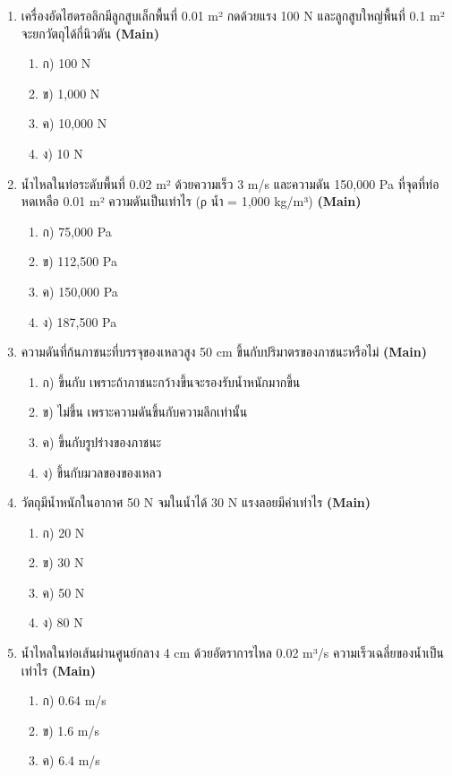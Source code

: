 \documentclass[12pt]{article}
\begin{document}
\begin{enumerate}[label=\arabic*.]
\item เครื่องอัดไฮดรอลิกมีลูกสูบเล็กพื้นที่ 0.01 m² กดด้วยแรง 100 N และลูกสูบใหญ่พื้นที่ 0.1 m² จะยกวัตถุได้กี่นิวตัน \hfill \textbf{\small (Main)}
\begin{enumerate}[label=)]
\item ก) 100 N
\item ข) 1,000 N
\item ค) 10,000 N
\item ง) 10 N
\end{enumerate}
\item น้ำไหลในท่อระดับพื้นที่ 0.02 m² ด้วยความเร็ว 3 m/s และความดัน 150,000 Pa ที่จุดที่ท่อหดเหลือ 0.01 m² ความดันเป็นเท่าไร (ρ น้ำ = 1,000 kg/m³) \hfill \textbf{\small (Main)}
\begin{enumerate}[label=)]
\item ก) 75,000 Pa
\item ข) 112,500 Pa
\item ค) 150,000 Pa
\item ง) 187,500 Pa
\end{enumerate}
\item ความดันที่ก้นภาชนะที่บรรจุของเหลวสูง 50 cm ขึ้นกับปริมาตรของภาชนะหรือไม่ \hfill \textbf{\small (Main)}
\begin{enumerate}[label=)]
\item ก) ขึ้นกับ เพราะถ้าภาชนะกว้างขึ้นจะรองรับน้ำหนักมากขึ้น
\item ข) ไม่ขึ้น เพราะความดันขึ้นกับความลึกเท่านั้น
\item ค) ขึ้นกับรูปร่างของภาชนะ
\item ง) ขึ้นกับมวลของของเหลว
\end{enumerate}
\item วัตถุมีน้ำหนักในอากาศ 50 N จมในน้ำได้ 30 N แรงลอยมีค่าเท่าไร \hfill \textbf{\small (Main)}
\begin{enumerate}[label=)]
\item ก) 20 N
\item ข) 30 N
\item ค) 50 N
\item ง) 80 N
\end{enumerate}
\item น้ำไหลในท่อเส้นผ่านศูนย์กลาง 4 cm ด้วยอัตราการไหล 0.02 m³/s ความเร็วเฉลี่ยของน้ำเป็นเท่าไร \hfill \textbf{\small (Main)}
\begin{enumerate}[label=)]
\item ก) 0.64 m/s
\item ข) 1.6 m/s
\item ค) 6.4 m/s

\end{enumerate}
\end{enumerate}
\end{document}
